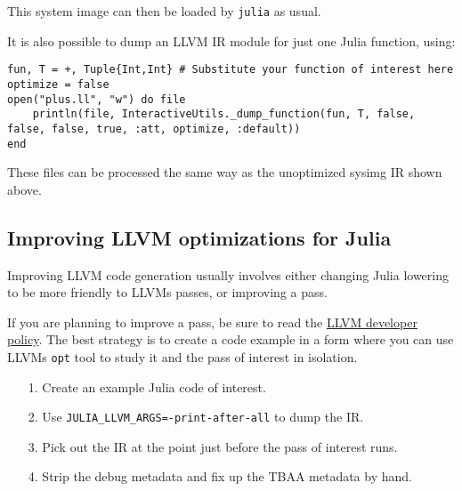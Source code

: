 This system image can then be loaded by \texttt{julia} as usual.



It is also possible to dump an LLVM IR module for just one Julia function, using:




\begin{verbatim}
fun, T = +, Tuple{Int,Int} # Substitute your function of interest here
optimize = false
open("plus.ll", "w") do file
    println(file, InteractiveUtils._dump_function(fun, T, false, false, false, true, :att, optimize, :default))
end
\end{verbatim}



These files can be processed the same way as the unoptimized sysimg IR shown above.



\hypertarget{18346154193244616171}{}


\subsection{Improving LLVM optimizations for Julia}



Improving LLVM code generation usually involves either changing Julia lowering to be more friendly to LLVM{\textquotesingle}s passes, or improving a pass.



If you are planning to improve a pass, be sure to read the \href{http://llvm.org/docs/DeveloperPolicy.html}{LLVM developer policy}. The best strategy is to create a code example in a form where you can use LLVM{\textquotesingle}s \texttt{opt} tool to study it and the pass of interest in isolation.



\begin{itemize}
\item[1. ] Create an example Julia code of interest.


\item[2. ] Use \texttt{JULIA\_LLVM\_ARGS=-print-after-all} to dump the IR.


\item[3. ] Pick out the IR at the point just before the pass of interest runs.


\item[4. ] Strip the debug metadata and fix up the TBAA metadata by hand.

\end{itemize}


